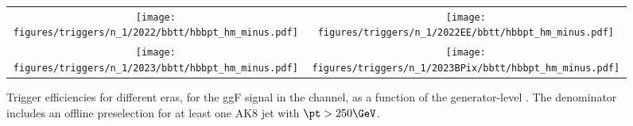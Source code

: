 
    \begin{figure}[H]
        \centering
        \begin{tabular}{cc}
            \texttt{[image: figures/triggers/n\_1/2022/bbtt/hbbpt\_hm\_minus.pdf]} &
            \texttt{[image: figures/triggers/n\_1/2022EE/bbtt/hbbpt\_hm\_minus.pdf]} \\[1ex]
            \texttt{[image: figures/triggers/n\_1/2023/bbtt/hbbpt\_hm\_minus.pdf]} &
            \texttt{[image: figures/triggers/n\_1/2023BPix/bbtt/hbbpt\_hm\_minus.pdf]}
            \label{fig}
        \end{tabular}
\caption{Trigger efficiencies for different eras, for the ggF \HHbbtt signal in the \tauhm channel, as a function of the generator-level \hbb \pt. The denominator includes an offline preselection for at least one AK8 jet with $\pt > 250\GeV$.}
\label{fig:triggers_n-1_bbtt_hm_hbbpt}
\end{figure}

